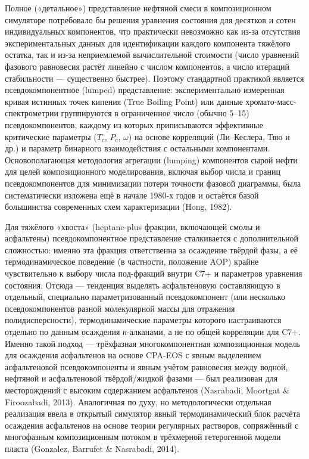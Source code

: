 \documentclass[11pt]{extarticle}
\begin{document}
Полное («детальное») представление нефтяной смеси в композиционном симуляторе потребовало бы решения уравнения состояния для десятков и сотен индивидуальных компонентов, что практически невозможно как из-за отсутствия экспериментальных данных для идентификации каждого компонента тяжёлого остатка, так и из-за неприемлемой вычислительной стоимости (число уравнений фазового равновесия растёт линейно с числом компонентов, а число итераций стабильности --- существенно быстрее). Поэтому стандартной практикой является псевдокомпонентное (lumped) представление: экспериментально измеренная кривая истинных точек кипения (True Boiling Point) или данные хромато-масс-спектрометрии группируются в ограниченное число (обычно 5--15) псевдокомпонентов, каждому из которых приписываются эффективные критические параметры (\(T_c\), \(P_c\), \(\omega\)) на основе корреляций (Ли--Кеслера, Твю и др.) и параметр бинарного взаимодействия с остальными компонентами. Основополагающая методология агрегации (lumping) компонентов сырой нефти для целей композиционного моделирования, включая выбор числа и границ псевдокомпонентов для минимизации потери точности фазовой диаграммы, была систематически изложена ещё в начале 1980-х годов и остаётся базой большинства современных схем характеризации (Hong, 1982).

Для тяжёлого «хвоста» (heptane-plus фракции, включающей смолы и асфальтены) псевдокомпонентное представление сталкивается с дополнительной сложностью: именно эта фракция ответственна за осаждение твёрдой фазы, а её термодинамическое поведение (в частности, положение AOP) крайне чувствительно к выбору числа под-фракций внутри C7+ и параметров уравнения состояния. Отсюда --- тенденция выделять асфальтеновую составляющую в отдельный, специально параметризованный псевдокомпонент (или несколько псевдокомпонентов разной молекулярной массы для отражения полидисперсности), термодинамические параметры которого настраиваются отдельно по данным осаждения \emph{н}-алканами, а не по общей корреляции для C7+. Именно такой подход --- трёхфазная многокомпонентная композиционная модель для осаждения асфальтенов на основе CPA-EOS с явным выделением асфальтеновой псевдокомпоненты и явным учётом равновесия между водной, нефтяной и асфальтеновой твёрдой/жидкой фазами --- был реализован для месторождений с высоким содержанием асфальтенов (Nasrabadi, Moortgat \& Firoozabadi, 2013). Аналогичная по духу, но методологически отдельная реализация ввела в открытый симулятор явный термодинамический блок расчёта осаждения асфальтенов на основе теории регулярных растворов, сопряжённый с многофазным композиционным потоком в трёхмерной гетерогенной модели пласта (Gonzalez, Barrufet \& Nasrabadi, 2014).
\end{document}
